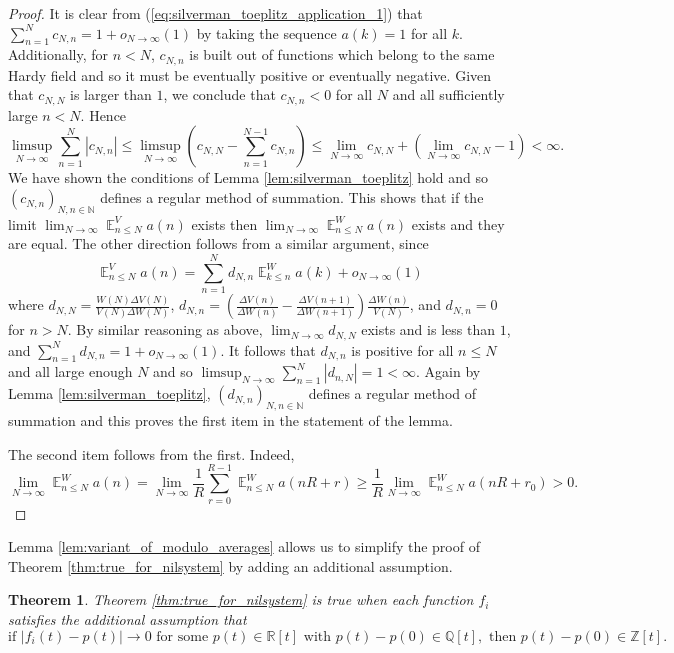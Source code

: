 \documentclass[12pt]{article}
\theoremstyle{plain} %
\newtheorem{theorem}{Theorem}[section]
\theoremstyle{definition} %
\theoremstyle{plain}
\theoremstyle{plain}
\numberwithin{equation}{section}
\newcommand{\N}{\mathbb{N}}
\newcommand{\Z}{\mathbb{Z}}
\newcommand{\R}{\mathbb{R}}
\newcommand{\Q}{\mathbb{Q}}
\renewcommand{\leq}{\leqslant}
\renewcommand{\geq}{\geqslant}
\newcommand{\1}{\mathbbm{1}}
\newcommand{\E}{\operatorname{\mathbb{E}}}
\newcommand{\oo}{\infty}
\begin{document}
\begin{proof}
It is clear from (\ref{eq:silverman_toeplitz_application_1}) that $\sum_{n=1}^Nc_{N,n} = 1+o_{N\to\oo}(1)$ by taking the sequence $a(k) = 1$ for all $k$. Additionally, for $n<N$, $c_{N,n}$ is built out of functions which belong to the same Hardy field and so it must be eventually positive or eventually negative. Given that $c_{N,N}$ is larger than $1$, we conclude that $c_{N,n}< 0$ for all $N$ and all sufficiently large $n<N$. Hence 
\begin{equation}
\limsup_{N\to\oo}\sum_{n=1}^N|c_{N,n}| \leq \limsup_{N\to\oo}\left(c_{N,N}-\sum_{n=1}^{N-1}c_{N,n}\right) \leq \lim_{N\to\oo}c_{N,N}+\left(\lim_{N\to\oo}c_{N,N}-1\right)<\oo.
\end{equation}
We have shown the conditions of Lemma \ref{lem:silverman_toeplitz} hold and so $(c_{N,n})_{N,n\in \N}$ defines a regular method of summation. This shows that if the limit $\lim_{N\to\oo}\E_{n\leq N}^Va(n)$ exists then $\lim_{N\to\oo}\E_{n\leq N}^Wa(n)$ exists and they are equal. The other direction follows from a similar argument, since
\[
\E_{n\leq N}^Va(n) = \sum_{n=1}^Nd_{N,n}\E_{k\leq n}^Wa(k)+o_{N\to\oo}(1)
\]
where $d_{N,N} =\frac{W(N)\Delta V(N)}{V(N)\Delta W(N)}$, $d_{N,n} = \left(\frac{\Delta V(n)}{\Delta W(n)}-\frac{\Delta V(n+1)}{\Delta W(n+1)}\right)\frac{\Delta W(n)}{V(N)}$, and $d_{N,n}=0$ for $n>N$. By similar reasoning as above, $\lim_{N\to\oo}d_{N,N}$ exists and is less than $1$, and $\sum_{n=1}^Nd_{N,n}= 1+o_{N\to\oo}(1)$. It follows that $d_{N,n}$ is positive for all $n\leq N$ and all large enough $N$ and so $\limsup_{N\to\oo}\sum_{n=1}^N|d_{n,N}|=1<\oo$. Again by Lemma \ref{lem:silverman_toeplitz}, $(d_{N,n})_{N,n\in \N}$ defines a regular method of summation and this proves the first item in the statement of the lemma.

The second item follows from the first. Indeed,
\[
\lim_{N\to\oo}\E_{n\leq N}^Wa(n)=\lim_{N\to\oo}\frac{1}{R}\sum_{r=0}^{R-1}\E_{n\leq N}^Wa(nR+r)\geq \frac{1}{R}\lim_{N\to\oo}\E_{n\leq N}^Wa(nR+r_0)>0.
\]
\end{proof}
Lemma \ref{lem:variant_of_modulo_averages} allows us to simplify the proof of Theorem \ref{thm:true_for_nilsystem} by adding an additional assumption.
\begin{theorem}\label{thm:true_for_nilsystems_and_also}
    Theorem \ref{thm:true_for_nilsystem} is true when each function $f_i$ satisfies the additional assumption that
\begin{equation}\label{eq:additional_assumption}
    \text{if }|f_i(t)-p(t)|\to 0\text{ for some }p(t)\in \R[t] \text{ with }p(t)-p(0)\in \Q[t], \text{ then }p(t)-p(0)\in \Z[t].
\end{equation}
\end{theorem}
\end{document}
